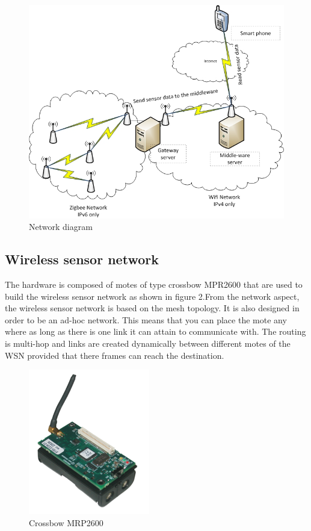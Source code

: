 \documentclass[conference]{IEEEtran}
\begin{document}
\begin{figure}[htbp]
\centering
\includegraphics[scale=0.48]{images/network_diagram.jpg}
\caption{Network diagram}
\label{fig:network}
\end{figure}

\subsection{Wireless sensor network}
The hardware is composed of motes of type crossbow MPR2600 that are used to build the wireless sensor network as shown in figure 2.From the network aspect, the wireless sensor network is based on the mesh topology. It is also designed in order to be an ad-hoc network. This means that you can place the mote any where as long as there is one link it can attain to communicate with. The routing is multi-hop and links are created dynamically between different motes of the WSN provided that there frames can reach the destination.

\begin{figure}[htbp]
\centering
\includegraphics[scale=0.5]{images/micaz.png}
\caption{Crossbow MRP2600}
\label{fig:micaz}
\end{figure}
\end{document}
